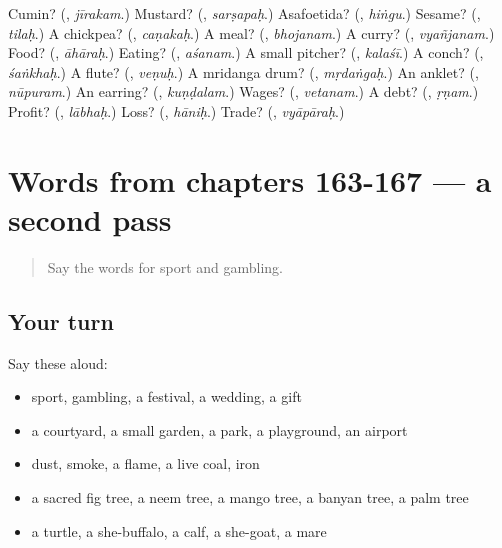 \begin{tcolorbox}[breakable,colback=teal!4,colframe=teal!35!black,title={Before you move on}]
Cumin? (\textbf{}, \emph{jīrakam}.) Mustard? (\textbf{}, \emph{sarṣapaḥ}.) Asafoetida? (\textbf{}, \emph{hiṅgu}.) Sesame? (\textbf{}, \emph{tilaḥ}.) A chickpea? (\textbf{}, \emph{caṇakaḥ}.) A meal? (\textbf{}, \emph{bhojanam}.) A curry? (\textbf{}, \emph{vyañjanam}.) Food? (\textbf{}, \emph{āhāraḥ}.) Eating? (\textbf{}, \emph{aśanam}.) A small pitcher? (\textbf{}, \emph{kalaśī}.) A conch? (\textbf{}, \emph{śaṅkhaḥ}.) A flute? (\textbf{}, \emph{veṇuḥ}.) A mridanga drum? (\textbf{}, \emph{mṛdaṅgaḥ}.) An anklet? (\textbf{}, \emph{nūpuram}.) An earring? (\textbf{}, \emph{kuṇḍalam}.) Wages? (\textbf{}, \emph{vetanam}.) A debt? (\textbf{}, \emph{ṛṇam}.) Profit? (\textbf{}, \emph{lābhaḥ}.) Loss? (\textbf{}, \emph{hāniḥ}.) Trade? (\textbf{}, \emph{vyāpāraḥ}.)
\end{tcolorbox}
\section[(dialogue)]{Words from chapters 163-167 — a second pass}

\label{lesson:SA-R167-second-pass-words-from-chapters-163-167}



\begin{quote}
Say the words for sport and gambling.
\end{quote}

\subsection*{Your turn}
Say these aloud:

\begin{itemize}
\raggedright
  \item sport, gambling, a festival, a wedding, a gift
  \item a courtyard, a small garden, a park, a playground, an airport
  \item dust, smoke, a flame, a live coal, iron
  \item a sacred fig tree, a neem tree, a mango tree, a banyan tree, a palm tree
  \item a turtle, a she-buffalo, a calf, a she-goat, a mare
\end{itemize}

